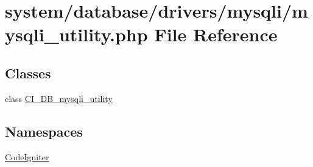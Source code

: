 \hypertarget{mysqli__utility_8php}{}\section{system/database/drivers/mysqli/mysqli\+\_\+utility.php File Reference}
\label{mysqli__utility_8php}
\subsection*{Classes}
\begin{DoxyCompactItemize}
\item 
class \mbox{\hyperlink{class_c_i___d_b__mysqli__utility}{C\+I\+\_\+\+D\+B\+\_\+mysqli\+\_\+utility}}
\end{DoxyCompactItemize}
\subsection*{Namespaces}
\begin{DoxyCompactItemize}
\item 
 \mbox{\hyperlink{namespace_code_igniter}{Code\+Igniter}}
\end{DoxyCompactItemize}
